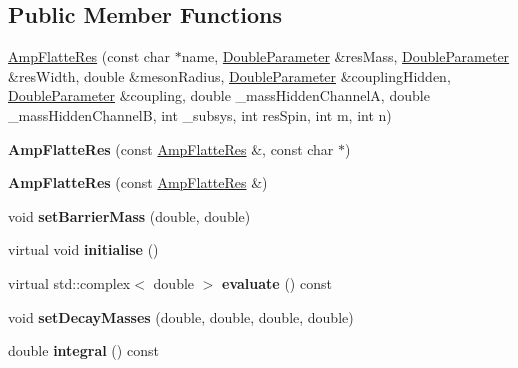 \subsection*{Public Member Functions}
\begin{DoxyCompactItemize}
\item 
\hyperlink{class_amp_flatte_res_ac3fe9d6623c886a1d830d1096cf488bb}{Amp\-Flatte\-Res} (const char $\ast$name, \hyperlink{class_double_parameter}{Double\-Parameter} \&res\-Mass, \hyperlink{class_double_parameter}{Double\-Parameter} \&res\-Width, double \&meson\-Radius, \hyperlink{class_double_parameter}{Double\-Parameter} \&coupling\-Hidden, \hyperlink{class_double_parameter}{Double\-Parameter} \&coupling, double \-\_\-mass\-Hidden\-Channel\-A, double \-\_\-mass\-Hidden\-Channel\-B, int \-\_\-subsys, int res\-Spin, int m, int n)
\item 
\hypertarget{class_amp_flatte_res_a39f722458936723ff3a92e70b2a1a1c6}{{\bfseries Amp\-Flatte\-Res} (const \hyperlink{class_amp_flatte_res}{Amp\-Flatte\-Res} \&, const char $\ast$)}\label{class_amp_flatte_res_a39f722458936723ff3a92e70b2a1a1c6}

\item 
\hypertarget{class_amp_flatte_res_abfcd5665519217946d69f89e77359211}{{\bfseries Amp\-Flatte\-Res} (const \hyperlink{class_amp_flatte_res}{Amp\-Flatte\-Res} \&)}\label{class_amp_flatte_res_abfcd5665519217946d69f89e77359211}

\item 
\hypertarget{class_amp_flatte_res_aceb105ba7f489aeceb2bfd173da0d814}{void {\bfseries set\-Barrier\-Mass} (double, double)}\label{class_amp_flatte_res_aceb105ba7f489aeceb2bfd173da0d814}

\item 
\hypertarget{class_amp_flatte_res_a73a7e85ab72937d88b7972f43dcfee6e}{virtual void {\bfseries initialise} ()}\label{class_amp_flatte_res_a73a7e85ab72937d88b7972f43dcfee6e}

\item 
\hypertarget{class_amp_flatte_res_a3ec6caa50a53820e4f3074a72091882b}{virtual std\-::complex$<$ double $>$ {\bfseries evaluate} () const }\label{class_amp_flatte_res_a3ec6caa50a53820e4f3074a72091882b}

\item 
\hypertarget{class_amp_flatte_res_adf81c0acd73732e33021e218f422a4d7}{void {\bfseries set\-Decay\-Masses} (double, double, double, double)}\label{class_amp_flatte_res_adf81c0acd73732e33021e218f422a4d7}

\item 
\hypertarget{class_amp_flatte_res_ae3226ffa36fab59f58739301c806eddc}{double {\bfseries integral} () const }\label{class_amp_flatte_res_ae3226ffa36fab59f58739301c806eddc}


\end{DoxyCompactItemize}
